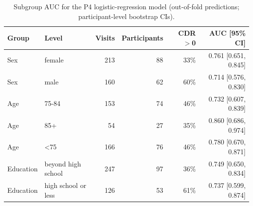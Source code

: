 \begin{table}[t]
\centering
\caption{Subgroup AUC for the P4 logistic-regression model (out-of-fold predictions; participant-level bootstrap CIs).}
\label{tab:sub}
\small
\setlength{\tabcolsep}{4pt}
\begin{tabular}{llrrrr}
\toprule
Group & Level & Visits & Participants & CDR$>$0 & AUC [95\% CI] \\
\midrule
Sex & female & 213 & 88 & 33\% & 0.761 [0.651, 0.845] \\
Sex & male & 160 & 62 & 60\% & 0.714 [0.576, 0.830] \\
Age & 75-84 & 153 & 74 & 46\% & 0.732 [0.607, 0.839] \\
Age & 85+ & 54 & 27 & 35\% & 0.860 [0.686, 0.974] \\
Age & <75 & 166 & 76 & 46\% & 0.780 [0.670, 0.871] \\
Education & beyond high school & 247 & 97 & 36\% & 0.749 [0.650, 0.834] \\
Education & high school or less & 126 & 53 & 61\% & 0.737 [0.599, 0.874] \\
\bottomrule
\end{tabular}
\end{table}
